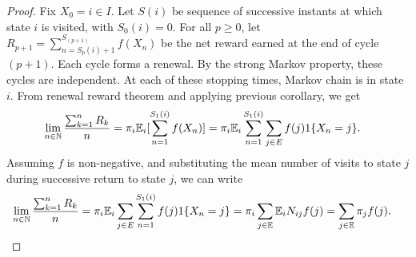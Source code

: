 \documentclass[a4paper,10pt,english]{article}
\begin{document}
\begin{proof}
Fix $X_0 = i \in I$. Let $S(i)$ be sequence of successive instants at which state $i$ is visited, with $S_0(i) = 0$. 
For all $p \geq 0$,  let $R_{p+1} = \sum_{n = S_p(i) + 1}^{S_{(p + 1)}} f(X_n)$ be the net reward earned at the end of cycle $(p+1)$. 
Each cycle forms a renewal. 
By the strong Markov property, these cycles are independent. 
At each of these stopping times, Markov chain is in state $i$. 
From renewal reward theorem and applying previous corollary, we get
\begin{align*}
\lim_{n \in \N}\frac{\sum_{k=1}^nR_k}{n} &= %
\pi_i\E_i[\sum_{n=1}^{S_1(i)}f(X_n)] = \pi_i\E_i\sum_{n=1}^{S_1(i)}\sum_{j \in E}f(j)1\{X_n = j\}.
\end{align*}
Assuming $f$ is non-negative, and substituting the mean number of visits to state $j$ during successive return to state $j$,  we can write 
\begin{align*}
\lim_{n \in \mathbb{N}}\frac{\sum_{k=1}^nR_k}{n} &= \pi_i\mathbb{E}_i\sum_{j \in E}\sum_{n=1}^{S_1(i)}f(j)1\{X_n = j\} = \pi_i\sum_{j \in \mathbb{E}}\mathbb{E}_iN_{ij}f(j)= \sum_{j \in \mathbb{E}}\pi_jf(j). 
\end{align*}

\end{proof}
\end{document}
